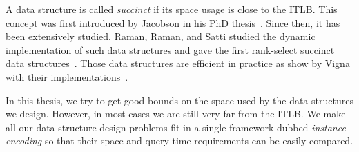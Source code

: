 A data structure is called \emph{succinct} if its space usage is close to the ITLB.
%
This concept was first introduced by Jacobson in his PhD thesis~\cite{Ja88}.
%
Since then, it has been extensively studied.
%
Raman, Raman, and Satti studied the dynamic implementation of such data
structures and gave the first rank-select succinct
data structures~\cite{RRS01,RRS07}.
%
%
Those data structures are efficient in practice as show by Vigna with
their implementations~\cite{Vi08}.

In this thesis, we try to get good bounds on the space used by the data
structures we design. However, in most cases we are still very far from the
ITLB. We make all our data structure design problems fit in a single framework
dubbed \emph{instance encoding} so that their space and query time
requirements can be easily compared.
%


